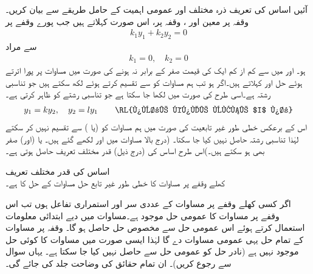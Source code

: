 آئیں اساس کی تعریف ذرہ مختلف اور عمومی اہمیت کے حامل طریقے سے بیان کریں۔  وقفہ  پر معین  اور ، وقفہ   پر، اس صورت  کہلاتے ہیں جب پورے وقفے پر
\begin{align}\label{مساوات_سادہ_دو_درجی_خطی_طور_غیر_تابع_الف}
k_1 y_1+k_2 y_2=0
\end{align}
سے مراد 
\begin{align}
k_1=0, \quad k_2=0
\end{align}
ہو۔ اور  میں سے کم از کم ایک کی قیمت صفر کے برابر نہ ہونے کی صورت میں مساوات  پر پورا اترتے ہوئے حل  اور   کہلاتے ہیں۔اگر  ہو تب ہم مساوات  کو  سے تقسیم کرتے ہوئے  لکھ سکتے ہیں جو تناسبی رشتہ ہے۔اسی طرح  کی صورت میں  لکھا جا سکتا ہے جو تناسبی رشتے کو ظاہر کرتی ہے۔
\begin{align}
y_1=k y_2,\quad y_2=l y_1 \quad \quad  \text{\RL{پورے کھلے وقفے $I$ پر}}
\end{align}
اس کے برعکس خطی طور غیر تابعیت کی صورت میں ہم مساوات  کو  (یا ) سے تقسیم نہیں کر سکتے لہٰذا  تناسبی رشتہ حاصل نہیں کیا جا سکتا۔ (درج بالا مساوات میں  اور  لکھے گئے ہیں۔ یا (اور)  صفر بھی ہو سکتے ہیں۔)اس طرح اساس کی (درج ذیل) قدر مختلف تعریف حاصل ہوتی ہے۔

\quad اساس کی قدر مختلف تعریف\\
کھلے وقفے  پر مساوات  کا خطی طور غیر تابع حل   مساوات  کے حل کا  ہے۔

اگر کسی کھلے وقفے  پر  مساوات  کے  عددی سر  اور  استمراری تفاعل ہوں تب اس وقفے پر مساوات   کا عمومی حل موجود ہے۔مساوات  میں دیے ابتدائی معلومات استعمال کرتے ہوئے اس عمومی حل سے  مخصوص حل حاصل ہو گا۔ وقفہ  پر مساوات  کے تمام حل یہی عمومی مساوات دے گا لہٰذا ایسی صورت میں مساوات کا کوئی  حل موجود نہیں ہے (نادر حل کو عمومی حل سے حاصل نہیں کیا جا سکتا ہے۔ یہاں سوال  سے رجوع کریں)۔ ان تمام حقائق کی وضاحت جلد کی جائے گی۔

